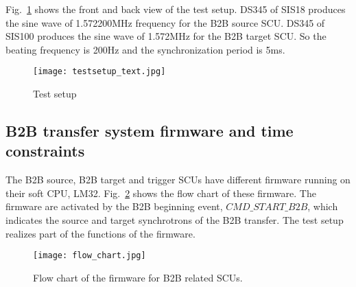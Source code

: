 Fig.~\ref{testsetup_text} shows the front and back view of the test setup. DS345 of SIS18 produces the sine wave of 1.572200MHz frequency for the B2B source SCU. DS345 of SIS100 produces the sine wave of 1.572MHz for the B2B target SCU. So the beating frequency is 200Hz and the synchronization period is 5ms. 

\begin{figure}[!htb]
   \centering   
   \texttt{[image: testsetup\_text.jpg]}
   \caption{Test setup}
   \label{testsetup_text}
\end{figure}

\subsection{B2B transfer system firmware and time constraints}

The B2B source, B2B target and trigger SCUs have different firmware running on their soft CPU, LM32. Fig.~\ref{flow_chart} shows the flow chart of these firmware. The firmware are activated by the B2B beginning event, $CMD\_START\_B2B$, which indicates the source and target synchrotrons of the B2B transfer. The test setup realizes part of the functions of the firmware.
\begin{figure}[!htb]
   \centering   
   \texttt{[image: flow\_chart.jpg]}
   \caption{Flow chart of the firmware for B2B related SCUs.}
   \label{flow_chart}
\end{figure}

